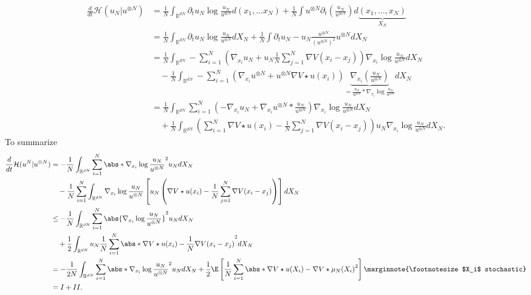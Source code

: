 \begin{align*}
  \frac{d}{dt} \mathcal{H}(u_N | u^{\otimes N}) &= \frac{1}{N} \int_{\mathbb{R}^{dN} } \partial_t u_N  \log \frac{u_N}{u^{\otimes N} }d(x_{1},\ldots x_N) + \frac{1}{N} \int u^{\otimes N}  \partial_t (\frac{u_N}{u^{\otimes N} }) d\underbrace{(x_{1},\ldots ,x_N)}_{X_N} \\
                                                &= \frac{1}{N} \int_{\mathbb{R}^{dN} } \partial_t u_N  \log \frac{u_N}{u^{\otimes N} }dX_N + \frac{1}{N} \int \partial_t u_N - u_N \frac{u^{\otimes N}}{(u^{\otimes N} )^2} u^{\otimes N} dX_N\\
                                                &= \frac{1}{N} \int_{\mathbb{R}^{dN} }- \sum_{i=1}^{N}(\nabla_{x_i} u_N + u_N \frac{1}{N} \sum_{j=1}^{N} \nabla V (x_i-x_j) ) \nabla_{x_i} \log \frac{u_N}{u^{\otimes N} } dX_N\\
                                                &\quad - \frac{1}{N} \int_{\mathbb{R}^{dN} }-  \sum_{i=1}^{N}(\nabla_{x_i} u^{\otimes N}  + u^{\otimes N} \nabla V \star u(x_i) ) \underbrace{\nabla_{x_i}(\frac{u_N}{u^{\otimes N} })}_{= \frac{u_N}{u^{\otimes N} }*\nabla_{x_i} \log \frac{u_N}{u^{\otimes N} }}dX_N\\
                                                &= \frac{1}{N} \int_{\mathbb{R}^{dN} } \sum_{i=1}^{N}(-\nabla_{x_i}u_N + \nabla_{x_i} u^{\otimes N}*\frac{u_N}{u^{\otimes N} } ) \nabla_{x_i} \log \frac{u_N}{u^{\otimes N} } dX_N\\
                                                &\quad + \frac{1}{N} \int_{\mathbb{R}^{dN} } \left(\sum_{i=1}^{N} \nabla V \star  u(x_i)  - \frac{1}{N} \sum_{j=1}^{N}  \nabla V(x_i - x_j) \right)u_N \nabla_{x_i} \log \frac{u_N}{u^{\otimes N} } dX_N
.\end{align*}
To summarize 
\begin{align*}
  \frac{d}{dt} \mathcal{H}(u^{N} | u^{\otimes N}  ) &= -   \frac{1}{N} \int_{\mathbb{R}^{dN} } \sum_{i=1}^{N}  \abs*{\nabla_{x_i} \log \frac{u_N}{u^{\otimes N} }}^2 u_N d X_N\\
                                                    &\quad - \frac{1}{N} \sum_{i=1}^{N} \int_{\mathbb{R}^{dN} }  \nabla_{x_i} \log \frac{u_N}{u^{\otimes N} } \left[ u_N \left(\nabla V \star u(x_i) - \frac{1}{N} \sum_{j=1}^{N} \nabla V(x_i-x_j) \right) \right]  dX_N\\
                                                    &\le - \frac{1}{N} \int_{\mathbb{R}^{dN} } \sum_{i=1}^{N} \abs{\nabla_{x_i} \log \frac{u_N}{u^{\otimes N} }}^2 u_N dX_N \\
                                                    &\quad + \frac{1}{2} \int_{\mathbb{R}^{dN} } u_N \frac{1}{N} \sum_{i=1}^{N}  \abs*{\nabla V \star  u (x_i) - \frac{1}{N} \nabla V(x_i-x_j) }^2 dX_N\\
                                                    &= -\frac{1}{2N} \int_{\mathbb{R}^{dN} } \sum_{i=1}^{N} \abs*{\nabla_{x_i} \log  \frac{u_N}{u^{\otimes N} }}^2 u_N dX_N + \frac{1}{2} \E\left[\frac{1}{N} \sum_{i=1}^{N} \abs*{\nabla V \star  u(X_i)-\nabla V \star  \mu_N(X_i)}^2 \right] \marginnote{\footnotesize $X_i$ stochastic}\\
                                                    &= I + II
.\end{align*}
